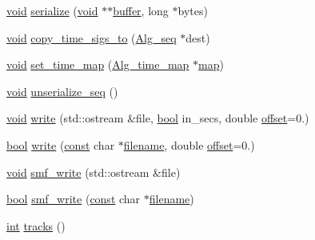 \begin{DoxyCompactItemize}
\hyperlink{sound_8c_ae35f5844602719cf66324f4de2a658b3}{void} \hyperlink{class_alg__seq_a591d5bc9cab506871666800b7968e446}{serialize} (\hyperlink{sound_8c_ae35f5844602719cf66324f4de2a658b3}{void} $\ast$$\ast$\hyperlink{structbuffer}{buffer}, long $\ast$bytes)
\item 
\hyperlink{sound_8c_ae35f5844602719cf66324f4de2a658b3}{void} \hyperlink{class_alg__seq_a29c87780f3a2b88e49670339b9403e9c}{copy\+\_\+time\+\_\+sigs\+\_\+to} (\hyperlink{class_alg__seq}{Alg\+\_\+seq} $\ast$dest)
\item 
\hyperlink{sound_8c_ae35f5844602719cf66324f4de2a658b3}{void} \hyperlink{class_alg__seq_a8246038097682b990db6d97eecc032a1}{set\+\_\+time\+\_\+map} (\hyperlink{class_alg__time__map}{Alg\+\_\+time\+\_\+map} $\ast$\hyperlink{structmap}{map})
\item 
\hyperlink{sound_8c_ae35f5844602719cf66324f4de2a658b3}{void} \hyperlink{class_alg__seq_a5cf28b495e4f05654cf6e8b3d1e1e134}{unserialize\+\_\+seq} ()
\item 
\hyperlink{sound_8c_ae35f5844602719cf66324f4de2a658b3}{void} \hyperlink{class_alg__seq_a0e343d15fce9075f9ddcc74b8b4c2ba2}{write} (std\+::ostream \&file, \hyperlink{mac_2config_2i386_2lib-src_2libsoxr_2soxr-config_8h_abb452686968e48b67397da5f97445f5b}{bool} in\+\_\+secs, double \hyperlink{layer12_8c_a33d71f23ba2052d17f0b754dc35265b0}{offset}=0.)
\item 
\hyperlink{mac_2config_2i386_2lib-src_2libsoxr_2soxr-config_8h_abb452686968e48b67397da5f97445f5b}{bool} \hyperlink{class_alg__seq_acc41dea420a2aabfd09ecb0381e784ff}{write} (\hyperlink{getopt1_8c_a2c212835823e3c54a8ab6d95c652660e}{const} char $\ast$\hyperlink{test__portburn_8cpp_a7efa5e9c7494c7d4586359300221aa5d}{filename}, double \hyperlink{layer12_8c_a33d71f23ba2052d17f0b754dc35265b0}{offset}=0.)
\item 
\hyperlink{sound_8c_ae35f5844602719cf66324f4de2a658b3}{void} \hyperlink{class_alg__seq_af360cc6536299c79144e0e1aad97d935}{smf\+\_\+write} (std\+::ostream \&file)
\item 
\hyperlink{mac_2config_2i386_2lib-src_2libsoxr_2soxr-config_8h_abb452686968e48b67397da5f97445f5b}{bool} \hyperlink{class_alg__seq_a9a71371892558351281f2f4a09d99cf7}{smf\+\_\+write} (\hyperlink{getopt1_8c_a2c212835823e3c54a8ab6d95c652660e}{const} char $\ast$\hyperlink{test__portburn_8cpp_a7efa5e9c7494c7d4586359300221aa5d}{filename})
\item 
\hyperlink{xmltok_8h_a5a0d4a5641ce434f1d23533f2b2e6653}{int} \hyperlink{class_alg__seq_a3622f70e1fc93ad8847c259f7b6afecc}{tracks} ()
$$
\end{DoxyCompactItemize}
